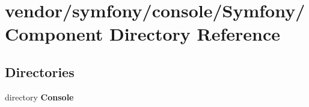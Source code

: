 \section{vendor/symfony/console/\+Symfony/\+Component Directory Reference}
\label{dir_cb4560137271079ab6ed13a9958b7672}
\subsection*{Directories}
\begin{DoxyCompactItemize}
\item 
directory {\bf Console}
\end{DoxyCompactItemize}
